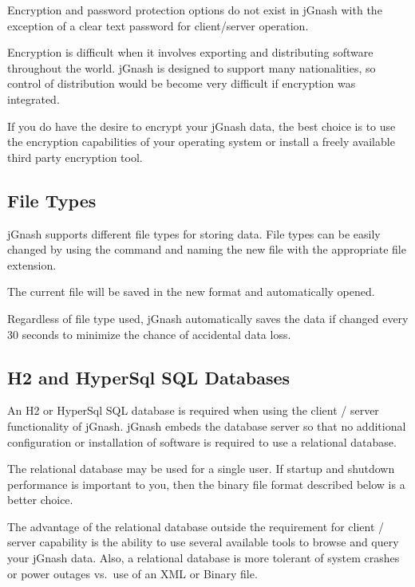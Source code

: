 \documentclass[letterpaper,12pt]{book}
\begin{document}
    \begin{mdframed}[style=info]
        Encryption and password protection options do not exist in jGnash with the exception of a clear text password
        for client/server operation.

        Encryption is difficult when it involves exporting and distributing software throughout the world.
        jGnash is designed to support many nationalities, so control of distribution would be become very difficult if
        encryption was integrated.

        If you do have the desire to encrypt your jGnash data, the best choice is to use the encryption capabilities
        of your operating system or
        install a freely available third party encryption tool.
    \end{mdframed}

    \subsection{File Types}
    \label{subsec:fileTypes}
    jGnash supports different file types for storing data.
    File types can be easily changed by using the  command and naming the new file with the
    appropriate file extension.

    The current file will be saved in the new format and automatically opened.

    Regardless of file type used, jGnash automatically saves the data if changed every 30 seconds to minimize the
    chance of accidental data loss.


    \subsection{H2 and HyperSql SQL Databases}\label{subsec:h2-and-hypersql-sql-databases}
    An H2 or HyperSql SQL database is required when using the client / server functionality of jGnash.
    jGnash embeds the database server so that no additional configuration or installation of software is required
    to use a relational database.

    The relational database may be used for a single user.
    If startup and shutdown performance is important to you, then the binary file format described below is a better choice.

    The advantage of the relational database outside the requirement for client / server capability is the ability
    to use several available tools to browse
    and query your jGnash data.
    Also, a relational database is more tolerant of system crashes or power outages vs.\ use of an XML or Binary file.
\end{document}
